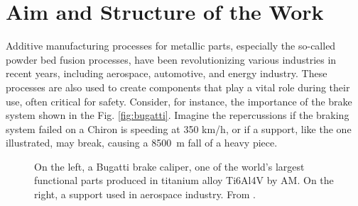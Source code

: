 \section{Aim and Structure of the Work}
\label{sec:aimwork}
Additive manufacturing processes for metallic parts, especially the so-called powder bed fusion processes, have been revolutionizing various industries in recent years, including aerospace, automotive, and energy industry. These processes are also used to create components that play a vital role during their use, often critical for safety. Consider, for instance, the importance of the brake system shown in the Fig. \ref{fig:bugatti}. Imagine the repercussions if the braking system failed on a Chiron is speeding at 350 km/h, or if a support, like the one illustrated, may break, causing a \SI{8500}{\metre} fall of a heavy piece. 
\begin{figure}[H]
    \centering
    \quad
    \caption[Functional AM part printed in metal.]{On the left, a Bugatti brake caliper, one of the world’s largest functional parts produced in titanium alloy Ti6Al4V by AM. On the right, a support used in aerospace industry. From \citeauthor{du_plessis_beautiful_2019}.}
    \label{fig:funcpart}
\end{figure}
